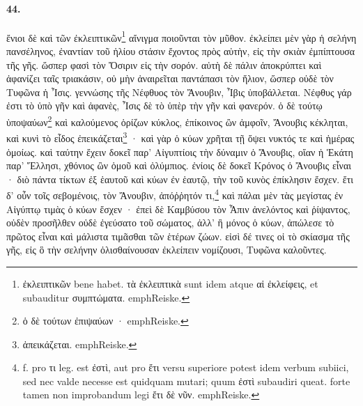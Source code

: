 \documentclass[a4paper, 11pt, oneside, polutonikogreek, german]{article}
\begin{document}
\paragraph{44.}
ἔνιοι δὲ καὶ τῶν ἐκλειπτικῶν\footnote{ἐκλειπτικῶν bene habet. τὰ ἐκλειπτικὰ sunt idem atque αἱ ἐκλείφεις, et subauditur συμπτώματα. emph{Reiske.}} αἴνιγμα ποιοῦνται τὸν μῦθον. ἐκλείπει μὲν γὰρ ἡ σελήνη πανσέληνος, ἐναντίαν τοῦ ἡλίου στάσιν ἔχοντος πρὸς αὐτὴν, εἰς τὴν σκιὰν ἐμπίπτουσα τῆς γῆς. ὥσπερ φασὶ τὸν Ὄσιριν εἰς τὴν σορόν. αὐτὴ δὲ πάλιν ἀποκρύπτει καὶ ἀφανίζει ταῖς τριακάσιν, οὐ μὴν ἀναιρεῖται παντάπασι τὸν ἥλιον, ὥσπερ οὐδὲ τὸν Τυφῶνα ἡ Ἶσις. γεννώσης τῆς Νέφθυος τὸν Ἄνουβιν, Ἶβις ὑποβάλλεται. Νέφθυς γάρ ἐστι τὸ ὑπὸ γῆν καὶ ἀφανὲς, Ἶσις δὲ τὸ ὑπὲρ τὴν γῆν καὶ φανερόν. ὁ δὲ τούτῳ ὑποψαύων\footnote{ὁ δὲ τούτων ἐπιψαύων · emph{Reiske.}} καὶ καλούμενος ὁρίζων κύκλος, ἐπίκοινος ὢν ἀμφοῖν, Ἄνουβις κέκληται, καὶ κυνὶ τὸ εἶδος ἐπεικάζεται\footnote{ἀπεικάζεται. emph{Reiske.}} · καὶ γὰρ ὁ κύων χρῆται τῇ ὄψει νυκτός τε καὶ ἡμέρας ὁμοίως. καὶ ταύτην ἔχειν δοκεῖ παρ' Αἰγυπτίοις τὴν δύναμιν ὁ Ἄνουβις, οἵαν ἡ Ἑκάτη παρ' Ἕλλησι, χθόνιος ὢν ὁμοῦ καὶ ὀλύμπιος. ἐνίοις δὲ δοκεῖ Κρόνος ὁ Ἄνουβις εἶναι · διὸ πάντα τίκτων ἐξ ἑαυτοῦ καὶ κύων ἐν ἑαυτῷ, τὴν τοῦ κυνὸς ἐπίκλησιν ἔσχεν. ἔτι δ' οὖν τοῖς σεβομένοις, τὸν Ἄνουβιν, ἀπόῤῥητόν τι,\footnote{f. pro τι leg. est ἐστὶ, aut pro ἔτι versu superiore potest idem verbum subiici, sed nec valde necesse est quidquam mutari; quum ἐστὶ subaudiri queat. forte tamen non improbandum legi ἔτι δὲ νῦν. emph{Reiske.}} καὶ πάλαι μὲν τὰς μεγίστας ἐν Αἰγύπτῳ τιμὰς ὁ κύων ἔσχεν · ἐπεὶ δὲ Καμβύσου τὸν Ἆπιν ἀνελόντος καὶ ῥίψαντος, οὐδὲν προσῆλθεν οὐδὲ ἐγεύσατο τοῦ σώματος, ἀλλ' ἢ μόνος ὁ κύων, ἀπώλεσε τὸ πρῶτος εἶναι καὶ μάλιστα τιμᾶσθαι τῶν ἑτέρων ζώων. εἰσὶ δέ τινες οἱ τὸ σκίασμα τῆς γῆς, εἰς ὃ τὴν σελήνην ὀλισθαίνουσαν ἐκλείπειν νομίζουσι, Τυφῶνα καλοῦντες.
\end{document}
